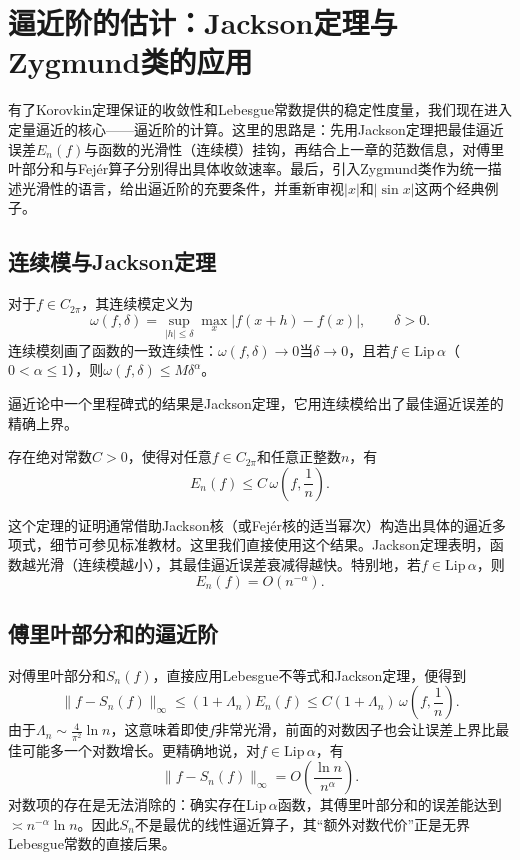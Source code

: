 
\section{逼近阶的估计：Jackson定理与Zygmund类的应用}

有了Korovkin定理保证的收敛性和Lebesgue常数提供的稳定性度量，我们现在进入定量逼近的核心——逼近阶的计算。这里的思路是：先用Jackson定理把最佳逼近误差$E_n(f)$与函数的光滑性（连续模）挂钩，再结合上一章的范数信息，对傅里叶部分和与Fejér算子分别得出具体收敛速率。最后，引入Zygmund类作为统一描述光滑性的语言，给出逼近阶的充要条件，并重新审视$|x|$和$|\sin x|$这两个经典例子。

\subsection{连续模与Jackson定理}

对于$f\in C_{2\pi}$，其连续模定义为
\[
\omega(f,\delta)=\sup_{|h|\le\delta}\max_{x}|f(x+h)-f(x)|,\qquad\delta>0.
\]
连续模刻画了函数的一致连续性：$\omega(f,\delta)\to0$当$\delta\to0$，且若$f\in\mathrm{Lip}\,\alpha$（$0<\alpha\le1$），则$\omega(f,\delta)\le M\delta^\alpha$。

逼近论中一个里程碑式的结果是Jackson定理，它用连续模给出了最佳逼近误差的精确上界。

\begin{theorem}
存在绝对常数$C>0$，使得对任意$f\in C_{2\pi}$和任意正整数$n$，有
\[
E_n(f)\le C\,\omega\!\left(f,\frac1n\right).
\]
\end{theorem}

这个定理的证明通常借助Jackson核（或Fejér核的适当幂次）构造出具体的逼近多项式，细节可参见标准教材。这里我们直接使用这个结果。Jackson定理表明，函数越光滑（连续模越小），其最佳逼近误差衰减得越快。特别地，若$f\in\mathrm{Lip}\,\alpha$，则
\[
E_n(f)=O(n^{-\alpha}).
\]

\subsection{傅里叶部分和的逼近阶}

对傅里叶部分和$S_n(f)$，直接应用Lebesgue不等式和Jackson定理，便得到
\[
\|f-S_n(f)\|_\infty\le (1+\Lambda_n)E_n(f)
\le C(1+\Lambda_n)\,\omega\!\left(f,\frac1n\right).
\]
由于$\Lambda_n\sim\frac{4}{\pi^2}\ln n$，这意味着即使$f$非常光滑，前面的对数因子也会让误差上界比最佳可能多一个对数增长。更精确地说，对$f\in\mathrm{Lip}\,\alpha$，有
\[
\|f-S_n(f)\|_\infty=O\!\left(\frac{\ln n}{n^\alpha}\right).
\]
对数项的存在是无法消除的：确实存在$\mathrm{Lip}\,\alpha$函数，其傅里叶部分和的误差能达到$\asymp n^{-\alpha}\ln n$。因此$S_n$不是最优的线性逼近算子，其“额外对数代价”正是无界Lebesgue常数的直接后果。

